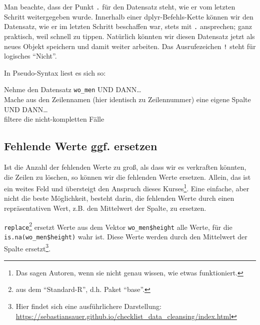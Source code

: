\documentclass[12pt,ngerman,]{book}
\makeatletter
\newenvironment{Shaded}{\begin{snugshade}}{\end{snugshade}}
\newcommand{\KeywordTok}[1]{\textcolor[rgb]{0.13,0.29,0.53}{\textbf{{#1}}}}
\newcommand{\DataTypeTok}[1]{\textcolor[rgb]{0.13,0.29,0.53}{{#1}}}
\newcommand{\StringTok}[1]{\textcolor[rgb]{0.31,0.60,0.02}{{#1}}}
\newcommand{\OtherTok}[1]{\textcolor[rgb]{0.56,0.35,0.01}{{#1}}}
\newcommand{\NormalTok}[1]{{#1}}
\let\rmarkdownfootnote\footnote%
\def\footnote{\protect\rmarkdownfootnote}
\newenvironment{kframe}{%
\medskip{}
\setlength{\fboxsep}{.8em}
 \def\at@end@of@kframe{}%
 \ifinner\ifhmode%
  \def\at@end@of@kframe{\end{minipage}}%
  \begin{minipage}{\columnwidth}%
 \fi\fi%
 \def\FrameCommand##1{\hskip\@totalleftmargin \hskip-\fboxsep
 \colorbox{shadecolor}{##1}\hskip-\fboxsep
     \hskip-\linewidth \hskip-\@totalleftmargin \hskip\columnwidth}%
 \MakeFramed {\advance\hsize-\width
   \@totalleftmargin\z@ \linewidth\hsize
   \@setminipage}}%
 {\par\unskip\endMakeFramed%
 \at@end@of@kframe}
\renewenvironment{Shaded}{\begin{kframe}}{\end{kframe}}
\let\BeginKnitrBlock\begin \let\EndKnitrBlock\end
\makeatother
\begin{document}
Man beachte, dass der Punkt \texttt{.} für den Datensatz steht, wie er
vom letzten Schritt weitergegeben wurde. Innerhalb einer
dplyr-Befehls-Kette können wir den Datensatz, wie er im letzten Schritt
beschaffen war, stets mit \texttt{.} ansprechen; ganz praktisch, weil
schnell zu tippen. Natürlich könnten wir diesen Datensatz jetzt als
neues Objekt speichern und damit weiter arbeiten. Das Ausrufezeichen
\texttt{!} steht für logisches ``Nicht''.

In Pseudo-Syntax liest es sich so:

\BeginKnitrBlock{rmdpseudocode}
Nehme den Datensatz \texttt{wo\_men} UND DANN\ldots{}\\
Mache aus den Zeilennamen (hier identisch zu Zeilennummer) eine eigene
Spalte UND DANN\ldots{}\\
filtere die nicht-kompletten Fälle
\EndKnitrBlock{rmdpseudocode}

\subsection{Fehlende Werte ggf.
ersetzen}\label{fehlende-werte-ggf.-ersetzen}

Ist die Anzahl der fehlenden Werte zu groß, als dass wir es verkraften
könnten, die Zeilen zu löschen, so können wir die fehlenden Werte
ersetzen. Allein, das ist ein weites Feld und übersteigt den Anspruch
dieses Kurses\footnote{Das sagen Autoren, wenn sie nicht genau wissen,
  wie etwas funktioniert.}. Eine einfache, aber nicht die beste
Möglichkeit, besteht darin, die fehlenden Werte durch einen
repräsentativen Wert, z.B. den Mittelwert der Spalte, zu ersetzen.

\begin{Shaded}
\end{Shaded}

\texttt{replace}\footnote{aus dem ``Standard-R'', d.h. Paket ``base''.}
ersetzt Werte aus dem Vektor \texttt{wo\_men\$height} alle Werte, für
die \texttt{is.na(wo\_men\$height)} wahr ist. Diese Werte werden durch
den Mittelwert der Spalte ersetzt\footnote{Hier findet sich eine
  ausführlichere Darstellung:
  \url{https://sebastiansauer.github.io/checklist_data_cleansing/index.html}}.
\end{document}
